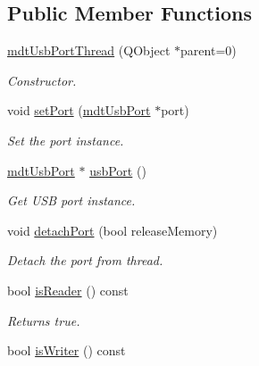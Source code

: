 \subsection*{Public Member Functions}
\begin{DoxyCompactItemize}
\item 
\hypertarget{classmdt_usb_port_thread_aaf4e5883224f05d80132b31a921ac899}{
\hyperlink{classmdt_usb_port_thread_aaf4e5883224f05d80132b31a921ac899}{mdtUsbPortThread} (QObject $\ast$parent=0)}
\label{classmdt_usb_port_thread_aaf4e5883224f05d80132b31a921ac899}

\begin{DoxyCompactList}\small\item\em Constructor. \end{DoxyCompactList}\item 
void \hyperlink{classmdt_usb_port_thread_a1661f362e2d772c1524f09daa6da3f15}{setPort} (\hyperlink{classmdt_usb_port}{mdtUsbPort} $\ast$port)
\begin{DoxyCompactList}\small\item\em Set the port instance. \end{DoxyCompactList}\item 
\hyperlink{classmdt_usb_port}{mdtUsbPort} $\ast$ \hyperlink{classmdt_usb_port_thread_aaa8e1ce181489dbae57c81b42dc6ad62}{usbPort} ()
\begin{DoxyCompactList}\small\item\em Get USB port instance. \end{DoxyCompactList}\item 
void \hyperlink{classmdt_usb_port_thread_a99070e7dba4bd7939b054cddbd66979f}{detachPort} (bool releaseMemory)
\begin{DoxyCompactList}\small\item\em Detach the port from thread. \end{DoxyCompactList}\item 
\hypertarget{classmdt_usb_port_thread_aed82b57c84745f1e2391750697db1022}{
bool \hyperlink{classmdt_usb_port_thread_aed82b57c84745f1e2391750697db1022}{isReader} () const }
\label{classmdt_usb_port_thread_aed82b57c84745f1e2391750697db1022}

\begin{DoxyCompactList}\small\item\em Returns true. \end{DoxyCompactList}\item 
\hypertarget{classmdt_usb_port_thread_a74258f300967b5dea1fbfa9a0ccab38a}{
bool \hyperlink{classmdt_usb_port_thread_a74258f300967b5dea1fbfa9a0ccab38a}{isWriter} () const }
\label{classmdt_usb_port_thread_a74258f300967b5dea1fbfa9a0ccab38a}


\end{DoxyCompactItemize}
